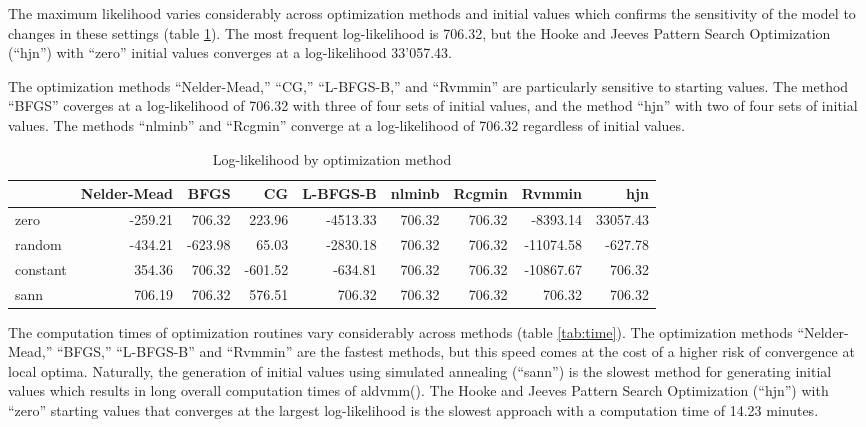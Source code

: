 \documentclass[
]{article}
\begin{document}
The maximum likelihood varies considerably across optimization methods and initial values which confirms the sensitivity of the model to changes in these settings (table \ref{tab:ll}). The most frequent log-likelihood is 706.32, but the Hooke and Jeeves Pattern Search Optimization (``hjn'') with ``zero'' initial values converges at a log-likelihood 33'057.43.

The optimization methods ``Nelder-Mead,'' ``CG,'' ``L-BFGS-B,'' and ``Rvmmin'' are particularly sensitive to starting values. The method ``BFGS'' coverges at a log-likelihood of 706.32 with three of four sets of initial values, and the method ``hjn'' with two of four sets of initial values. The methods ``nlminb'' and ``Rcgmin'' converge at a log-likelihood of 706.32 regardless of initial values.

\begin{table}[ht]
\centering
\caption{Log-likelihood by optimization method} 
\label{tab:ll}
\begin{tabular}{lrrrrrrrr}
  \hline
 & Nelder-Mead & BFGS & CG & L-BFGS-B & nlminb & Rcgmin & Rvmmin & hjn \\ 
  \hline
zero & -259.21 & 706.32 & 223.96 & -4513.33 & 706.32 & 706.32 & -8393.14 & 33057.43 \\ 
  random & -434.21 & -623.98 & 65.03 & -2830.18 & 706.32 & 706.32 & -11074.58 & -627.78 \\ 
  constant & 354.36 & 706.32 & -601.52 & -634.81 & 706.32 & 706.32 & -10867.67 & 706.32 \\ 
  sann & 706.19 & 706.32 & 576.51 & 706.32 & 706.32 & 706.32 & 706.32 & 706.32 \\ 
   \hline
\end{tabular}
\end{table}

The computation times of optimization routines vary considerably across methods (table \ref{tab:time}). The optimization methods ``Nelder-Mead,'' ``BFGS,'' ``L-BFGS-B'' and ``Rvmmin'' are the fastest methods, but this speed comes at the cost of a higher risk of convergence at local optima. Naturally, the generation of initial values using simulated annealing (``sann'') is the slowest method for generating initial values which results in long overall computation times of aldvmm(). The Hooke and Jeeves Pattern Search Optimization (``hjn'') with ``zero'' starting values that converges at the largest log-likelihood is the slowest approach with a computation time of 14.23 minutes.
\end{document}
